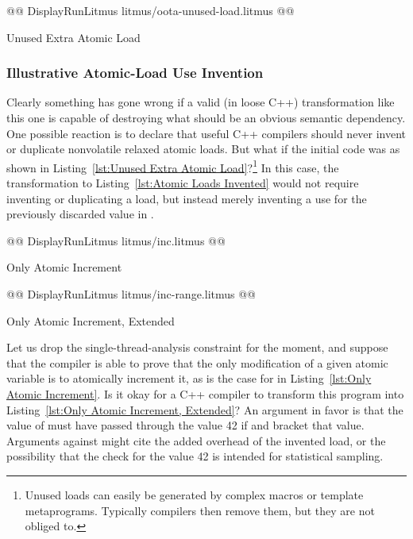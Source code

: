 \documentclass[10]{article}
\begin{document}
\begin{listing}[tbp]
@@ DisplayRunLitmus litmus/oota-unused-load.litmus @@
\caption{Unused Extra Atomic Load}
\label{lst:Unused Extra Atomic Load}
\end{listing}

\subsubsection{Illustrative Atomic-Load Use Invention}
\label{app:Illustrative Atomic-Load Use Invention}

Clearly something has gone wrong if a valid (in loose C++) transformation
like this one is capable of destroying what should be an obvious semantic
dependency.
One possible reaction is to declare that useful C++ compilers should never
invent or duplicate nonvolatile relaxed atomic loads.
But what if the initial code was as shown in
Listing~\ref{lst:Unused Extra Atomic Load}?\footnote{
	Unused loads can easily be generated by complex macros or
	template metaprograms.
	Typically compilers then remove them, but they are not obliged to.}
In this case, the transformation to
Listing~\ref{lst:Atomic Loads Invented}
would not require inventing or duplicating a load,
but instead merely inventing a use for
the previously discarded value in .

\begin{listing}[tbp]
@@ DisplayRunLitmus litmus/inc.litmus @@
\caption{Only Atomic Increment}
\label{lst:Only Atomic Increment}
\end{listing}

\begin{listing}[tbp]
@@ DisplayRunLitmus litmus/inc-range.litmus @@
\caption{Only Atomic Increment, Extended}
\label{lst:Only Atomic Increment, Extended}
\end{listing}

Let us drop the single-thread-analysis constraint for
the moment, and suppose that the compiler is able to prove
that the only modification of a given atomic variable is to atomically
increment it, as is the case for  in
Listing~\ref{lst:Only Atomic Increment}.
Is it okay for a C++ compiler to transform this program into
Listing~\ref{lst:Only Atomic Increment, Extended}?
An argument in favor is that the value of  must have
passed through the value 42 if  and 
bracket that value.
Arguments against might cite the added overhead of the invented load,
or the possibility that the check for the value 42 is intended for statistical
sampling.
\end{document}
